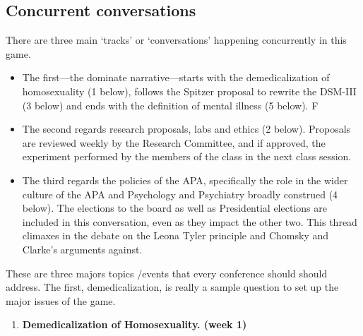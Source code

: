 \begin{refsection}
\subsection{Concurrent conversations}
\label{concurrentconversations}

There are three main ‘tracks’ or ‘conversations’ happening concurrently in this game. 

\begin{itemize}
\item The first---the dominate narrative---starts with the demedicalization of homosexuality (1 below), follows the Spitzer proposal to rewrite the DSM-III (3 below) and ends with the definition of mental illness (5 below). F

\item The second regards research proposals, labs and ethics (2 below). Proposals are reviewed weekly by the Research Committee, and if approved, the experiment performed by the members of the class in the next class session.

\item The third regards the policies of the APA, specifically the role in the wider culture of the APA and Psychology and Psychiatry broadly construed (4 below). The elections to the board as well as Presidential elections are included in this conversation, even as they impact the other two. This thread climaxes in the debate on the Leona Tyler principle and Chomsky and Clarke’s arguments against.

\end{itemize}

These are three majors topics \slash  events that every conference should should address. The first, demedicalization, is really a sample question to set up the major issues of the game.

\begin{enumerate}
\item \textbf{Demedicalization of Homosexuality. (week 1)}

\end{enumerate}


\end{refsection}

